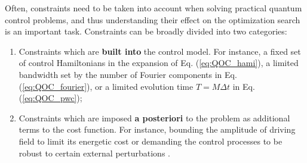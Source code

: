 Often, constraints need to be taken into account when solving practical quantum control problems, and thus understanding their effect on the optimization search is an important task. Constraints can be broadly divided into two categories: 
\begin{enumerate}
    \item Constraints which are \textbf{built into} the control model. For instance, a fixed set of control Hamiltonians in the expansion of Eq. (\ref{eq:QOC_hami}), a limited bandwidth set by the number of Fourier components in Eq. (\ref{eq:QOC_fourier}), or a limited evolution time $T = M\Delta t$ in Eq. (\ref{eq:QOC_pwc});
    \item Constraints which are imposed \textbf{a posteriori} to the problem as additional terms to the cost function. For instance, bounding the amplitude of driving field to limit its energetic cost \cite{reich2012} or demanding the control processes to be robust to certain external perturbations \cite{kosut2022,poggi2023_urc}.
\end{enumerate}

